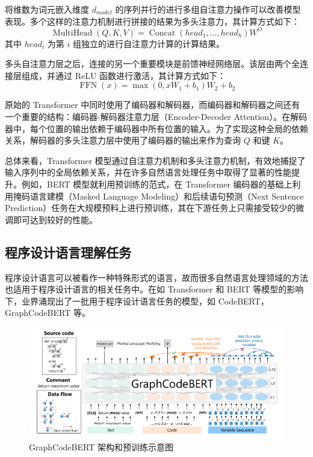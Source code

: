 将维数为词元嵌入维度 $ d_{model} $ 的序列并行的进行多组自注意力操作可以改善模型表现。多个这样的注意力机制进行拼接的结果为多头注意力，其计算方式如下：
$$
\operatorname{MultiHead}(Q, K, V) = \operatorname{Concat}(head_1, ..., head_h) W^{O}
$$
其中 $head_i$ 为第 $ i $ 组独立的进行自注意力计算的计算结果。

多头自注意力层之后，连接的另一个重要模块是前馈神经网络层。该层由两个全连接层组成，并通过 ReLU 函数进行激活，其计算方式如下：
$$
\operatorname{FFN}(x)= \max(0, x W_1 + b_1) W_2 + b_2
$$

原始的 Transformer 中同时使用了编码器和解码器，而编码器和解码器之间还有一个重要的结构：编码器-解码器注意力层（Encoder-Decoder Attention）。在解码器中，每个位置的输出依赖于编码器中所有位置的输入。为了实现这种全局的依赖关系，解码器的多头注意力层中使用了编码器的输出来作为查询 $Q$ 和键 $K$。

总体来看，Transformer 模型通过自注意力机制和多头注意力机制，有效地捕捉了输入序列中的全局依赖关系，并在许多自然语言处理任务中取得了显著的性能提升。例如，BERT \cite{devlin-etal-2019-bert} 模型就利用预训练的范式，在 Transformer 编码器的基础上利用掩码语言建模（Masked Language Modeling）和后续语句预测（Next Sentence Prediction）任务在大规模预料上进行预训练，其在下游任务上只需接受较少的微调即可达到较好的性能。

\subsection{程序设计语言理解任务}

程序设计语言可以被看作一种特殊形式的语言，故而很多自然语言处理领域的方法也适用于程序设计语言的相关任务中。在如 Transformer\cite{Vaswani2017AttentionIA} 和 BERT\cite{devlin-etal-2019-bert} 等模型的影响下，业界涌现出了一批用于程序设计语言任务的模型，如 CodeBERT\cite{feng-etal-2020-codebert}，GraphCodeBERT\cite{DBLP:conf/iclr/GuoRLFT0ZDSFTDC21} 等。

\begin{figure}
    \centering
    \includegraphics[width=1.0\linewidth]{figures/GraphCodeBERT-Crop.pdf}
    \caption{GraphCodeBERT 架构和预训练示意图\cite{DBLP:conf/iclr/GuoRLFT0ZDSFTDC21}}
    \label{fig:graphCodeBERT_arch_and_pretrain}
\end{figure}

